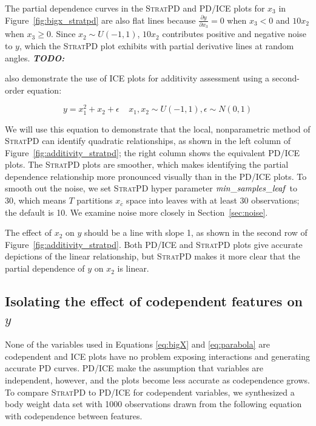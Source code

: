 \documentclass[12pt]{article}
\newcommand{\secref}[1]{Section~\ref{#1}}
\newcommand{\figref}[1]{Figure~\ref{#1}}
\newcommand{\todo}[1]{{\bf\em TODO:} {{\color{red}{#1}}}}
\newcommand{\spd}{\fontfamily{cmr}\textsc{\small StratPD}}
\newcommand{\xnc}{$x_{\overline{c}}$}
\begin{document}
The partial dependence curves in the \spd{} and PD/ICE plots for $x_3$ in \figref{fig:bigx_stratpd} are also flat lines because $\frac{\partial y}{\partial x_3}=0$ when $x_3 < 0$ and $10 x_2$ when $x_3 \ge 0$. Since $x_2 \sim U(-1,1)$, $10 x_2$ contributes positive and negative noise to $y$, which the \spd{} plot exhibits with partial derivative lines at random angles.   \todo{James: can you check the ICE paper when they describe that the interactions of $x_3$ are just around 0?  From the equation they are clearly $\ge 0$.}

\cite{ICE} also demonstrate the use of ICE plots for additivity assessment using a second-order equation:

\begin{equation}\label{eq:parabola}
y = x_1^2 + x_2 + \epsilon~~~~~x_1, x_2 \sim U(-1,1), \epsilon \sim N(0,1)
\end{equation}

\noindent We will use this equation to demonstrate that the local, nonparametric method of \spd{} can identify quadratic relationships, as shown in the left column of \figref{fig:additivity_stratpd}; the right column shows the equivalent PD/ICE plots. The \spd{} plots are smoother, which makes identifying the partial dependence relationship more pronounced visually than in the PD/ICE plots.  To smooth out the noise, we set \spd{} hyper parameter ${\it min\_samples\_leaf}$ to 30, which means $T$ partitions \xnc{} space into leaves with at least 30 observations; the default is 10. We examine noise more closely in \secref{sec:noise}.

The effect of $x_2$ on $y$ should be a line with slope 1, as shown in the second row of \figref{fig:additivity_stratpd}. Both PD/ICE and \spd{} plots give accurate depictions of the linear relationship, but \spd{} makes it more clear that the partial dependence of $y$ on $x_2$ is linear.

\subsection{Isolating the effect of codependent features on $y$}\label{sec:codep}

None of the variables used in Equations \eqref{eq:bigX} and \eqref{eq:parabola} are codependent and ICE plots have no problem exposing interactions and generating accurate PD curves.  PD/ICE make the assumption that variables are independent, however, and the plots become less accurate as codependence grows.  To compare \spd{} to PD/ICE for codependent variables, we synthesized a body weight data set with 1000 observations drawn from the following equation with codependence between features.
\end{document}

